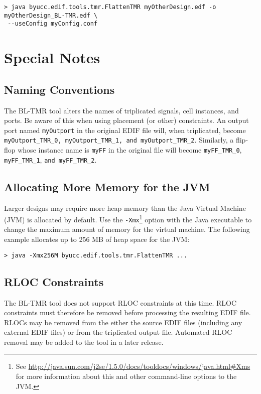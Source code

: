 \documentclass[english]{article}
\begin{document}
\begin{verbatim}
> java byucc.edif.tools.tmr.FlattenTMR myOtherDesign.edf -o myOtherDesign_BL-TMR.edf \
 --useConfig myConfig.conf
\end{verbatim}

\section{Special Notes}

\subsection{Naming Conventions}
\label{naming conventions}
The BL-TMR tool alters the names of triplicated signals, cell instances, and 
ports. Be aware of this when using placement (or other) constraints. An output 
port named \texttt{myOutport} in the original EDIF file will, when triplicated, 
become \texttt{myOutport\_TMR\_0, myOutport\_TMR\_1, and myOutport\_TMR\_2}. 
Similarly, a flip-flop whose instance name is \texttt{myFF} in the original file
will become \texttt{myFF\_TMR\_0}, \texttt{myFF\_TMR\_1}, 
\texttt{and myFF\_TMR\_2}.

\subsection{Allocating More Memory for the JVM}
Larger designs may require more heap memory than the Java Virtual Machine (JVM) 
is allocated by default. Use the \texttt{-Xmx}\footnote{See
\url{http://java.sun.com/j2se/1.5.0/docs/tooldocs/windows/java.html\#Xms} for
more information about this and other command-line options to the JVM.} option 
with the Java executable to change the maximum amount of memory for the virtual
machine. The following example allocates up to 256 MB of heap space for the JVM:

\begin{verbatim}
> java -Xmx256M byucc.edif.tools.tmr.FlattenTMR ...
\end{verbatim}

\subsection{RLOC Constraints}
The BL-TMR tool does not support RLOC constraints at this time. RLOC constraints 
must therefore be removed before processing the resulting EDIF file. RLOCs may 
be removed from the either the source EDIF files (including any external EDIF 
files) or from the triplicated output file. Automated RLOC removal may be added 
to the tool in a later release.
\end{document}
